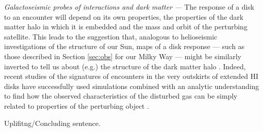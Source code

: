 \documentclass[galaxies,article,submit,moreauthors,pdftex,10pt,a4paper]{mdpi}
\begin{document}
\begin{description}
\item{\it Galactoseismic probes of interactions and dark matter ---}
The response of a disk to an encounter will depend on its own properties, the properties of the dark matter halo in which it is embedded and the mass and orbit of the perturbing satellite.
This leads to the suggestion that, analogous to helioseismic investigations of the structure of our Sun, maps of a disk response --- such as those described in Section \ref{sec:obs} for our Milky Way --- might be similarly inverted to tell us about (e.g.) the structure of the dark matter halo
\citep{widrow11}.
Indeed, recent studies of the signatures of encounters in the very outskirts of extended HI disks have successfully used simulations combined with an analytic understanding to find how the observed characteristics of the disturbed gas can be simply related to properties of the perturbing object \citep{chakrabarti09,chakrabart11a,chakrabarti11b,chang11}.
\end{description}

Uplifitng/Concluding sentence.

\vspace{6pt}





\end{document}
